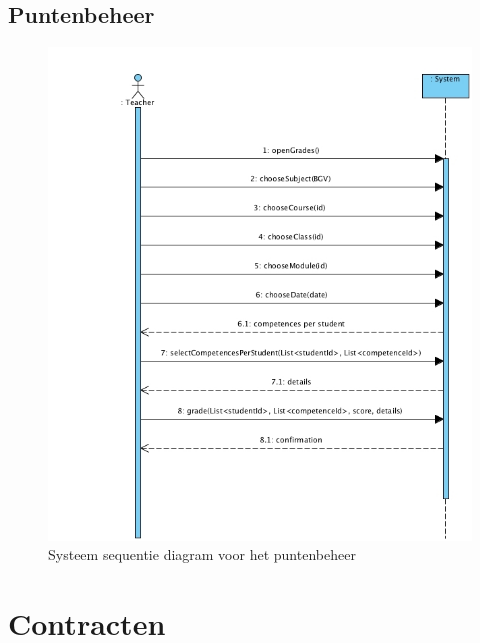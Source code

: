 \documentclass[a4paper]{article}
\begin{document}
\subsection{Puntenbeheer}
\begin{figure}[H]
  \includegraphics[width=\textwidth]{PuntenBeheerSSD}
  \caption{Systeem sequentie diagram voor het puntenbeheer}
  \label{fig:SSD_puntenbeheer}
\end{figure}

\newpage
\section{Contracten}
\end{document}
